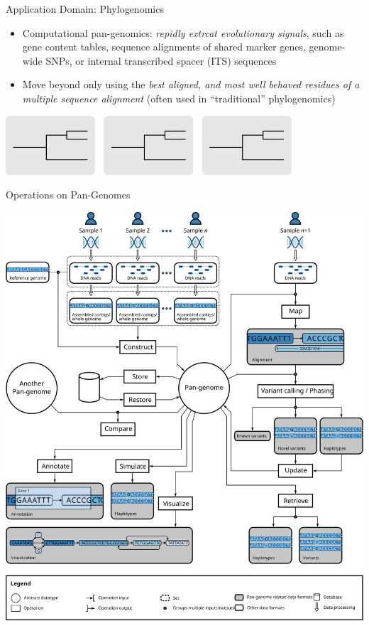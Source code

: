 \documentclass[notes=hide]{beamer}
\newcommand{\0}{\ensuremath{\mathtt{0}}}
\newcommand{\1}{\ensuremath{\mathtt{1}}}
\begin{document}
\begin{frame}{Application Domain: Phylogenomics}
\begin{itemize}
 \item Computational pan-genomics: \emph{repidly extrcat evolutionary signals}, such as gene content tables, sequence alignments of shared marker genes, genome-wide SNPs, or internal transcribed spacer (ITS) sequences
 \item Move beyond only using the \emph{best aligned, and most well behaved residues of a multiple sequence alignment} (often used in ``traditional'' phylogenomics)
\end{itemize}
\begin{center}
\includegraphics[width=0.8\textwidth]{figs/data-sources-phylo}
\end{center}
\end{frame}

\begin{frame}{Operations on Pan-Genomes}
\begin{center}
\includegraphics[width=.78\textwidth]{figs/paper/operations}
\end{center}
\end{frame}
\end{document}
